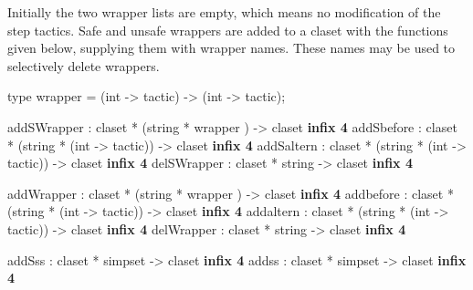 Initially the two wrapper lists are empty, which means no modification of the
step tactics. Safe and unsafe wrappers are added to a claset 
with the functions given below, supplying them with wrapper names. 
These names may be used to selectively delete wrappers.

\begin{ttbox} 
type wrapper = (int -> tactic) -> (int -> tactic);

addSWrapper  : claset * (string *  wrapper       ) -> claset \hfill{\bf infix 4}
addSbefore   : claset * (string * (int -> tactic)) -> claset \hfill{\bf infix 4}
addSaltern   : claset * (string * (int -> tactic)) -> claset \hfill{\bf infix 4}
delSWrapper  : claset *  string                    -> claset \hfill{\bf infix 4}

addWrapper   : claset * (string *  wrapper       ) -> claset \hfill{\bf infix 4}
addbefore    : claset * (string * (int -> tactic)) -> claset \hfill{\bf infix 4}
addaltern    : claset * (string * (int -> tactic)) -> claset \hfill{\bf infix 4}
delWrapper   : claset *  string                    -> claset \hfill{\bf infix 4}

addSss       : claset * simpset -> claset                 \hfill{\bf infix 4}
addss        : claset * simpset -> claset                 \hfill{\bf infix 4}
\end{ttbox}
%

